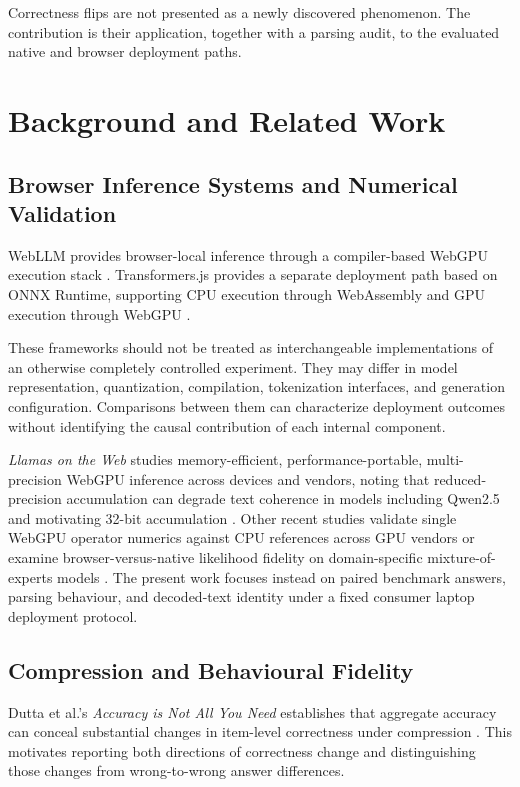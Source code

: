 \documentclass[conference]{IEEEtran}
\begin{document}
Correctness flips are not presented as a newly discovered
phenomenon. The contribution is their application, together
with a parsing audit, to the evaluated native and browser
deployment paths.


\section{Background and Related Work}
\label{sec:related}

\subsection{Browser Inference Systems and Numerical Validation}

WebLLM provides browser-local inference through a
compiler-based WebGPU execution stack \cite{webllm}.
Transformers.js provides a separate deployment path based on
ONNX Runtime, supporting CPU execution through WebAssembly
and GPU execution through WebGPU \cite{transformersjs}.

These frameworks should not be treated as interchangeable
implementations of an otherwise completely controlled
experiment. They may differ in model representation,
quantization, compilation, tokenization interfaces, and
generation configuration. Comparisons between them can
characterize deployment outcomes without identifying the
causal contribution of each internal component.

\emph{Llamas on the Web} studies memory-efficient,
performance-portable, multi-precision WebGPU inference across
devices and vendors, noting that reduced-precision accumulation
can degrade text coherence in models including Qwen2.5 and
motivating 32-bit accumulation \cite{llamas}. Other recent
studies validate single WebGPU operator numerics against CPU
references across GPU vendors \cite{maczan} or examine
browser-versus-native likelihood fidelity on domain-specific
mixture-of-experts models \cite{genomeocean}. The present work
focuses instead on paired benchmark answers, parsing
behaviour, and decoded-text identity under a fixed consumer
laptop deployment protocol.


\subsection{Compression and Behavioural Fidelity}

Dutta et al.'s \emph{Accuracy is Not All You Need} establishes
that aggregate accuracy can conceal substantial changes in
item-level correctness under compression \cite{accuracy}.
This motivates reporting both directions of correctness
change and distinguishing those changes from wrong-to-wrong
answer differences.
\end{document}
